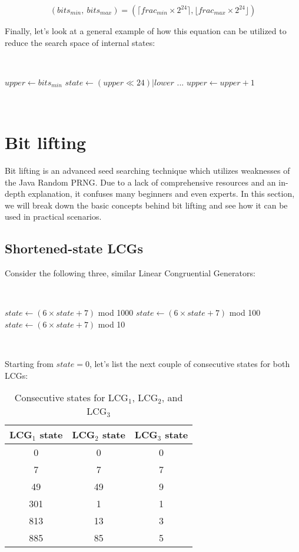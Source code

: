 \documentclass{article}
\begin{document}
\begin{equation}
    (bits_{min}, \ bits_{max}) = (\lceil frac_{min} \times 2^{24} \rceil, \lfloor frac_{max} \times 2^{24} \rfloor)
\end{equation}

Finally, let's look at a general example of how this equation can be utilized to reduce the search space of internal states:

\
\begin{algorithmic}
\State $upper \gets bits_{min}$
        \State $state \gets (upper \ll 24) | lower$
        \State ...
    \EndFor
    \State $upper \gets upper + 1$
\EndWhile
\end{algorithmic}
\ \

\section{Bit lifting}

Bit lifting is an advanced seed searching technique which utilizes weaknesses of the Java Random PRNG. Due to a lack of comprehensive resources and an in-depth explanation, it confuses many beginners and even experts. In this section, we will break down the basic concepts behind bit lifting and see how it can be used in practical scenarios.

\subsection{Shortened-state LCGs}

Consider the following three, similar Linear Congruential Generators:

\
\begin{algorithmic}
    \State $state \gets (6 \times state + 7)$ mod 1000
    \Comment{LCG$_1$}
    \State $state \gets (6 \times state + 7)$ mod 100
    \Comment{LCG$_2$}
    \State $state \gets (6 \times state + 7)$ mod 10
    \Comment{LCG$_3$}
\end{algorithmic}
\ \

\noindent Starting from $state = 0$, let’s list the next couple of consecutive states for both LCGs:

\begin{table}[h]
    \centering
    \begin{tabular}{|c|c|c|}
    \hline
         LCG$_1$ state & LCG$_2$ state & LCG$_3$ state \\
    \hline
         0 & 0 & 0   \\
         7 & 7 & 7   \\
         49 & 49 & 9  \\
         301 & 1 & 1   \\
         813 & 13 & 3  \\
         885 & 85 & 5  \\
    \hline
    \end{tabular}
    \caption{Consecutive states for LCG$_1$, LCG$_2$, and LCG$_3$}
    \label{tab:lcgs}
\end{table}
\end{document}
